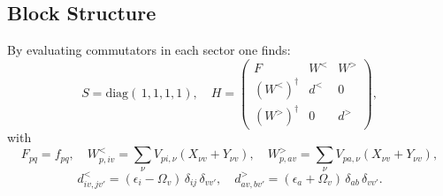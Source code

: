 \subsection*{Block Structure}
By evaluating commutators in each sector one finds:
\[
S=\mathrm{diag}(\,1,1,1,1),
\quad
H=\begin{pmatrix}
F & W^< & W^>\\
(W^<)^\dagger & d^< & 0\\
(W^>)^\dagger & 0 & d^>
\end{pmatrix},
\]
with
\[
F_{pq}=f_{pq},
\quad
W^<_{p,i v} = \sum_\nu V_{pi,\nu}(X_{\nu v}+Y_{\nu v}),
\quad
W^>_{p,a v}=\sum_\nu V_{pa,\nu}(X_{\nu v}+Y_{\nu v}),
\]
\[
d^<_{i v,j v'}=(\epsilon_i-\Omega_v)\,\delta_{ij}\,\delta_{vv'},
\quad
d^>_{a v,b v'}=(\epsilon_a+\Omega_v)\,\delta_{ab}\,\delta_{vv'}.
\]

